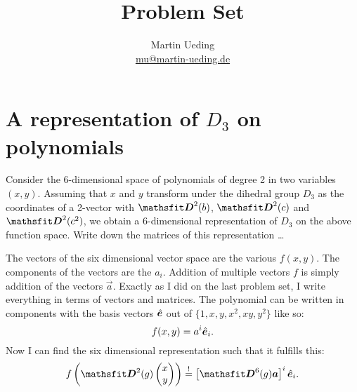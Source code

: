 \documentclass[11pt, english, fleqn, DIV=15, headinclude, BCOR=1cm]{scrartcl}
\title{Problem Set \arabic{problemset}}
\author{
    Martin Ueding \\ \small{\href{mailto:mu@martin-ueding.de}{mu@martin-ueding.de}}
}
\begin{document}
\maketitle

\section{A representation of $D_3$ on polynomials}

\begin{problem}
    Consider the 6-dimensional space of polynomials of degree 2 in two
    variables $(x, y)$. Assuming that $x$ and $y$ transform under the dihedral
    group $D_3$ as the coordinates of a 2-vector with $\tens D^2(b)$, $\tens
    D^2(c)$ and $\tens D^2(c^2)$, we obtain a 6-dimensional representation of
    $D_3$ on the above function space. Write down the matrices of this
    representation …
\end{problem}

The vectors of the six dimensional vector space are the various $f(x, y)$. The
components of the vectors are the $a_i$. Addition of multiple vectors $f$ is
simply addition of the vectors $\vec a$. Exactly as I did on the last problem
set, I write everything in terms of vectors and matrices. The polynomial can be
written in components with the basis vectors $\hat{\boldsymbol{e}}$ out of $\{1, x, y, x^2, xy,
y^2\}$ like so:
\[
    f(x, y) = a^i \hat{\boldsymbol{e}}_i.
\]
Now I can find the six dimensional representation such that it fulfills this:
\[
    f\del{\tens D^2(g) \begin{pmatrix}
        x \\ y
    \end{pmatrix}} \overset!= \sbr{\tens D^6(g) \vec a}^i \ev_i.
\]
\end{document}
